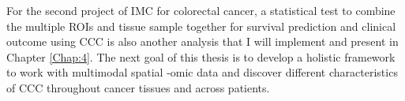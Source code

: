 For the second project of IMC for colorectal cancer, a statistical test to combine the multiple ROIs and tissue sample together for survival prediction and clinical outcome using CCC is also another analysis that I will implement and present in Chapter \ref{Chap:4}. The next goal of this thesis is to develop a holistic framework to work with multimodal spatial -omic data and discover different characteristics of CCC throughout cancer tissues and across patients. 




